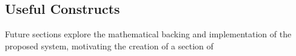\subsection{Useful Constructs}

Future sections explore the mathematical backing and implementation of the proposed system, motivating the creation of a section of 